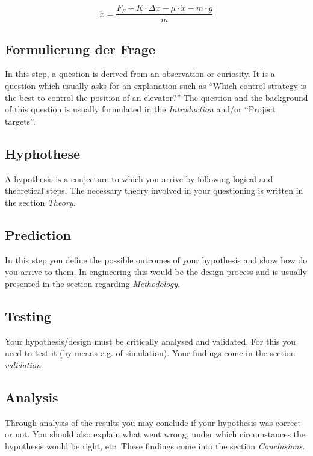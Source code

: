 	\begin{equation}
		\ddot{x} = \frac{F_{S} + K \cdot \Delta x - \mu \cdot \dot{x} - m \cdot g}{m}
		\label{eq:DifferenzengleichungAufgeloest}
	\end{equation}
	
	
	\subsection{Formulierung der Frage}
	
	In this step, a question is derived from an observation or curiosity. It is a question which usually asks for an explanation such as ``Which control strategy is the best to control the position of an elevator?'' The question and the background of this question is usually formulated in the \emph{Introduction} and/or ``Project targets''.
	
	\subsection{Hyphothese}
	
	A hypothesis is a conjecture to which you arrive by following logical and theoretical steps. The necessary theory involved in your questioning is written in the section \emph{Theory}.
	
	\subsection{Prediction}
	
	In this step you define the possible outcomes of your hypothesis and show how do you arrive to them. In engineering this would be the design process and is usually presented in the section regarding \emph{Methodology}.
	
	\subsection{Testing}
	
	Your hypothesis/design must be critically analysed and validated. For this you need to test it (by means e.g. of simulation). Your findings come in the section \emph{validation}.
	
	\subsection{Analysis}
	
	Through analysis of the results you may conclude if your hypothesis was correct or not. You should also explain what went wrong, under which circumstances the hypothesis would be right, etc. These findings come into the section \emph{Conclusions}.
	
